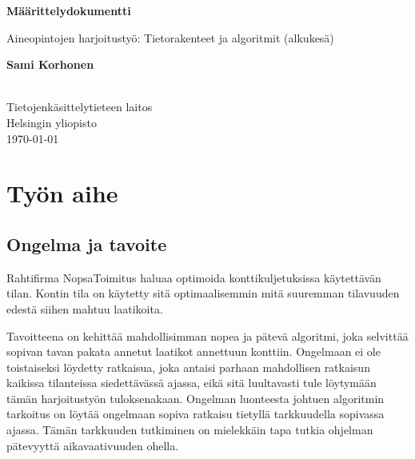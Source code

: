 \documentclass[a4paper,12pt, titlepage]{article}
\begin{document}
\begin{titlepage}
    \begin{center}
        \vspace*{1cm}
        
        \LARGE
        \textbf{Määrittelydokumentti}
        
        \vspace{0.5cm}
        \Large
        Aineopintojen harjoitustyö: Tietorakenteet ja algoritmit (alkukesä)
        
        \vspace{1.5cm}
        
        \large
        \textbf{Sami Korhonen} \\
         \\
        
		\vfill        
        \normalsize
        Tietojenkäsittelytieteen laitos\\
        Helsingin yliopisto\\
		\large        
        \today
        
    \end{center}
\end{titlepage}



\section*{Työn aihe}
\subsection*{Ongelma ja tavoite}
Rahtifirma NopsaToimitus haluaa optimoida konttikuljetuksissa käytettävän tilan. Kontin tila on käytetty sitä optimaalisemmin mitä suuremman tilavuuden edestä siihen mahtuu laatikoita. \newline

\noindent
Tavoitteena on kehittää mahdollisimman nopea ja pätevä algoritmi, joka selvittää sopivan tavan pakata annetut laatikot annettuun konttiin. Ongelmaan ei ole toistaiseksi löydetty ratkaisua, joka antaisi parhaan mahdollisen ratkaisun kaikissa tilanteissa siedettävässä ajassa, eikä sitä luultavasti tule löytymään tämän harjoitustyön tuloksenakaan. Ongelman luonteesta johtuen algoritmin tarkoitus on löytää ongelmaan sopiva ratkaisu tietyllä tarkkuudella sopivassa ajassa. Tämän tarkkuuden tutkiminen on mielekkäin tapa tutkia ohjelman pätevyyttä aikavaativuuden ohella.
\end{document}
